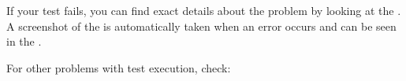 

If your test fails, you can find exact details about the problem by looking at the \gdtestresultview{} . A screenshot of the \gdaut{} is automatically taken when an error occurs and can be seen in the \gdimgview{}.

For other problems with test execution, check:

